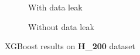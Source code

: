       \begin{figure}[H]
        \centering
        \begin{subfigure}{0.45\textwidth}
          \centering
          \resizebox{\textwidth}{!}{}
          \captionsetup{justification=centering}
          \caption{With data leak}
        \end{subfigure}%
        \hspace{0.05\textwidth}
        \begin{subfigure}{0.45\textwidth}
          \centering
          \resizebox{\textwidth}{!}{}
          \captionsetup{justification=centering}
          \caption{Without data leak}
        \end{subfigure}
        \caption{XGBoost results on \textbf{H\_200} dataset}\label{fig:porpoise_h200}
      \end{figure}

